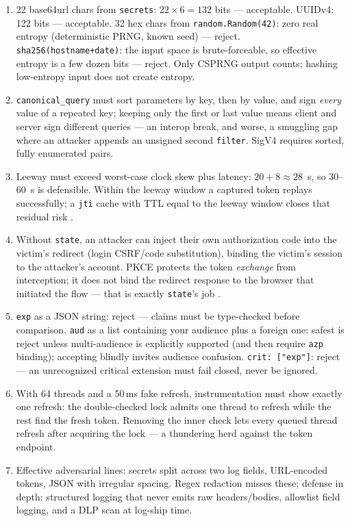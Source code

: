 \begin{enumerate}[leftmargin=2.2em]
  \item 22 base64url chars from \texttt{secrets}: $22\times6=132$ bits ---
    acceptable. UUIDv4: 122 bits --- acceptable. 32 hex chars from
    \texttt{random.Random(42)}: zero real entropy (deterministic PRNG, known
    seed) --- reject. \texttt{sha256(hostname+date)}: the input space is
    brute-forceable, so effective entropy is a few dozen bits --- reject.
    Only CSPRNG output counts; hashing low-entropy input does not create
    entropy.
  \item \texttt{canonical\_query} must sort parameters by key, then by
    value, and sign \emph{every} value of a repeated key; keeping only the
    first or last value means client and server sign different queries ---
    an interop break, and worse, a smuggling gap where an attacker appends
    an unsigned second \texttt{filter}. SigV4 requires sorted, fully
    enumerated pairs.
  \item Leeway must exceed worst-case clock skew plus latency: $20 +
    8 \approx 28$~s, so 30--60~s is defensible. Within the leeway window a
    captured token replays successfully; a \texttt{jti} cache with TTL equal
    to the leeway window closes that residual risk \cite{rfc7519}.
  \item Without \texttt{state}, an attacker can inject their own
    authorization code into the victim's redirect (login CSRF/code
    substitution), binding the victim's session to the attacker's account.
    PKCE protects the token \emph{exchange} from interception; it does not
    bind the redirect response to the browser that initiated the flow ---
    that is exactly \texttt{state}'s job \cite{rfc7636, rfc6749}.
  \item \texttt{exp} as a JSON string: reject --- claims must be type-checked
    before comparison. \texttt{aud} as a list containing your audience plus
    a foreign one: safest is reject unless multi-audience is explicitly
    supported (and then require \texttt{azp} binding); accepting blindly
    invites audience confusion. \texttt{crit: ["exp"]}: reject --- an
    unrecognized critical extension must fail closed, never be ignored.
  \item With 64 threads and a 50\,ms fake refresh, instrumentation must show
    exactly one refresh: the double-checked lock admits one thread to
    refresh while the rest find the fresh token. Removing the inner check
    lets every queued thread refresh after acquiring the lock --- a
    thundering herd against the token endpoint.
  \item Effective adversarial lines: secrets split across two log fields,
    URL-encoded tokens, JSON with irregular spacing. Regex redaction misses
    these; defense in depth: structured logging that never emits raw
    headers/bodies, allowlist field logging, and a DLP scan at log-ship
    time.
\end{enumerate}

